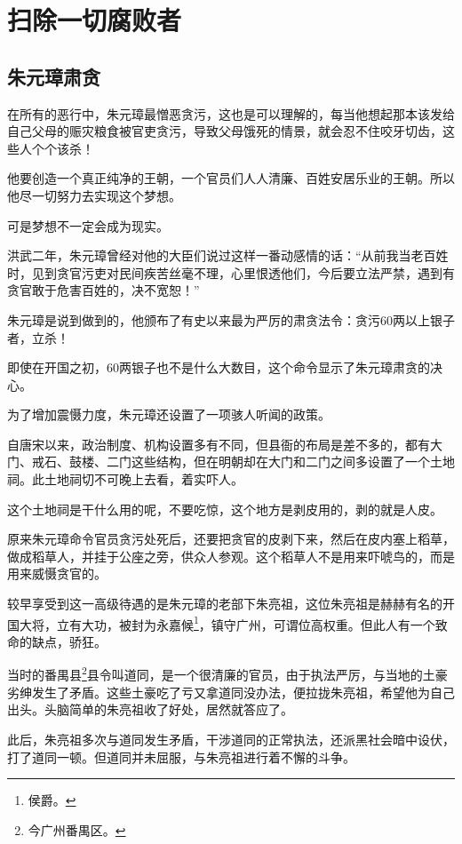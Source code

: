 \fi
\newpage
\section{扫除一切腐败者}
\ifnum{}
	\begin{multicols}{\theparacolNo}
		\fi
		\subsection{朱元璋肃贪}
		在所有的恶行中，朱元璋最憎恶贪污，这也是可以理解的，每当他想起那本该发给自己父母的赈灾粮食被官吏贪污，导致父母饿死的情景，就会忍不住咬牙切齿，这些人个个该杀！

		他要创造一个真正纯净的王朝，一个官员们人人清廉、百姓安居乐业的王朝。所以他尽一切努力去实现这个梦想。

		可是梦想不一定会成为现实。

		洪武二年，朱元璋曾经对他的大臣们说过这样一番动感情的话：“从前我当老百姓时，见到贪官污吏对民间疾苦丝毫不理，心里恨透他们，今后要立法严禁，遇到有贪官敢于危害百姓的，决不宽恕！”

		朱元璋是说到做到的，他颁布了有史以来最为严厉的肃贪法令：贪污60两以上银子者，立杀！

		即使在开国之初，60两银子也不是什么大数目，这个命令显示了朱元璋肃贪的决心。

		为了增加震慑力度，朱元璋还设置了一项骇人听闻的政策。

		自唐宋以来，政治制度、机构设置多有不同，但县衙的布局是差不多的，都有大门、戒石、鼓楼、二门这些结构，但在明朝却在大门和二门之间多设置了一个土地祠。此土地祠切不可晚上去看，着实吓人。

		这个土地祠是干什么用的呢，不要吃惊，这个地方是剥皮用的，剥的就是人皮。

		原来朱元璋命令官员贪污处死后，还要把贪官的皮剥下来，然后在皮内塞上稻草，做成稻草人，并挂于公座之旁，供众人参观。这个稻草人不是用来吓唬鸟的，而是用来威慑贪官的。

		较早享受到这一高级待遇的是朱元璋的老部下朱亮祖，这位朱亮祖是赫赫有名的开国大将，立有大功，被封为永嘉候\footnote{侯爵。}，镇守广州，可谓位高权重。但此人有一个致命的缺点，骄狂。

		当时的番禺县\footnote{今广州番禺区。}县令叫道同，是一个很清廉的官员，由于执法严厉，与当地的土豪劣绅发生了矛盾。这些土豪吃了亏又拿道同没办法，便拉拢朱亮祖，希望他为自己出头。头脑简单的朱亮祖收了好处，居然就答应了。

		此后，朱亮祖多次与道同发生矛盾，干涉道同的正常执法，还派黑社会暗中设伏，打了道同一顿。但道同并未屈服，与朱亮祖进行着不懈的斗争。


\end{multicols}
